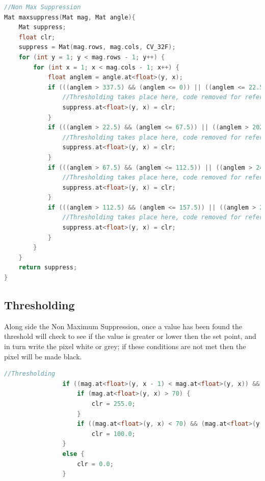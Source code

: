 \documentclass[a4paper, 10pt]{article}
\begin{document}
\begin{lstlisting}[language = C++]
//Non Max Suppression
Mat maxsuppress(Mat mag, Mat angle){
	Mat suppress;
	float clr;
	suppress = Mat(mag.rows, mag.cols, CV_32F);
	for (int y = 1; y < mag.rows - 1; y++) {
		for (int x = 1; x < mag.cols - 1; x++) {
			float anglem = angle.at<float>(y, x);
			if (((anglem > 337.5) && (anglem <= 0)) || ((anglem <= 22.5) && (anglem > 0)) || ((anglem > 157.5) && (anglem <= 202.5))){
				//Thresholding takes place here, code removed for reference 
				suppress.at<float>(y, x) = clr;
			}
			if (((anglem > 22.5) && (anglem <= 67.5)) || ((anglem > 202.5) && (anglem <= 247.5))){
				//Thresholding takes place here, code removed for reference 
				suppress.at<float>(y, x) = clr;
			}
			if (((anglem > 67.5) && (anglem <= 112.5)) || ((anglem > 245.5) && (anglem <= 292.5))){
				//Thresholding takes place here, code removed for reference 
				suppress.at<float>(y, x) = clr;
			}
			if (((anglem > 112.5) && (anglem <= 157.5)) || ((anglem > 292.5) && (anglem <= 337.5))){
				//Thresholding takes place here, code removed for reference 
				suppress.at<float>(y, x) = clr;
			}
		}
	}
	return suppress;
}
\end{lstlisting}


\clearpage
\subsection{Thresholding}

Along side the Non Maximum Suppression, once a value has been found the threshold will check to see if the value is greater or lower then the set point, and in turn write the pixel white or grey; if these conditions are not met then the pixel will be made black.

\begin{lstlisting}[language = C++]
				//Thresholding
				if ((mag.at<float>(y, x - 1) < mag.at<float>(y, x)) && (mag.at<float>(y, x) > mag.at<float>(y, x + 1))){
					if (mag.at<float>(y, x) > 70) {
						clr = 255.0;
					}
					if ((mag.at<float>(y, x) < 70) && (mag.at<float>(y, x) < 1))
						clr = 100.0;
				}
				else {
					clr = 0.0;
				}
\end{lstlisting}
\end{document}
